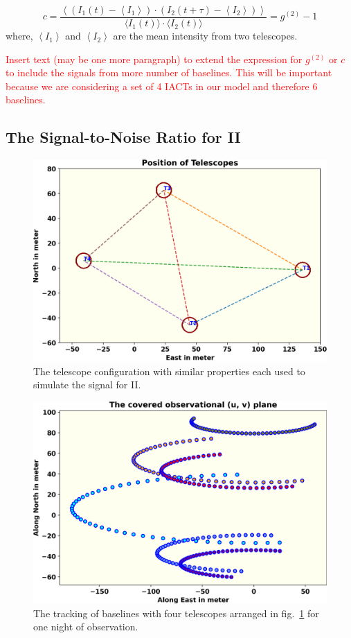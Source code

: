 \begin{equation}
	c = \frac{\left\langle \left( I_1(t) - \left\langle I_1 \right\rangle \right) \cdot \left( I_2(t + \tau) - \left\langle I_2 \right\rangle \right) \right\rangle}{\langle I_1(t) \rangle \cdot \langle I_2(t) \rangle} = g^{(2)} - 1
\end{equation}
where, $\left\langle I_1 \right\rangle$ and $\left\langle I_2 \right\rangle$ are the mean intensity from two telescopes.

\textcolor{red}{Insert text (may be one more paragraph) to extend the expression for $g^{(2)}$ or $c$ to include the signals from more number of baselines. This will be important because we are considering a set of 4 IACTs in our model and therefore 6 baselines.}


\subsection{The Signal-to-Noise Ratio for II}
\begin{figure}
	\centering
	\includegraphics[width=\linewidth]{fig/telescope.png}
	\caption{The telescope configuration with similar properties each used to simulate the signal for II.}
	\label{fig:teles}
\end{figure}
\begin{figure}
	\centering
	\includegraphics[width=\linewidth]{fig/baseline.png}
	\caption{The tracking of baselines with four telescopes arranged in fig.~\ref{fig:teles} for one night of observation.}
	\label{fig:base}
\end{figure}
